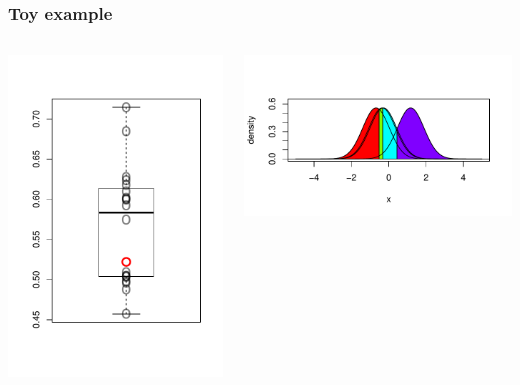 \documentclass{beamer}
\begin{document}
\begin{frame}
\frametitle{Toy example}
\begin{columns}
\begin{column}{0.5\textwidth}
\includegraphics[scale = 0.5]{../extrapolation/autoplots/box4_3.pdf}
\end{column}
\begin{column}{0.5\textwidth}
\includegraphics[scale = 0.5]{../extrapolation/autoplots/dens4_3.pdf}
\end{column}
\end{columns}
\end{frame}
\end{document}
